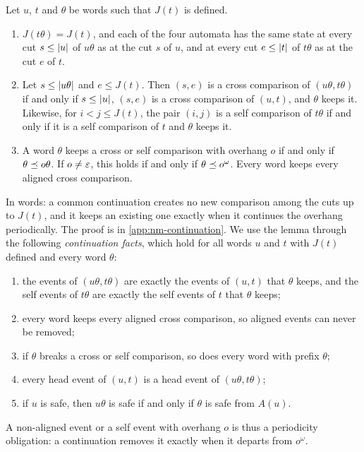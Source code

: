 \begin{lemma}\label{lem:nm-continuation}
Let $u$, $t$ and $\theta$ be words such that $J(t)$ is defined.
\begin{enumerate}[label=(\alph*)]
\item $J(t\theta)=J(t)$, and each of the four automata has the same state at
every cut $s\le\lvert u\rvert$ of $u\theta$ as at the cut $s$ of $u$, and at every cut
$e\le\lvert t\rvert$ of $t\theta$ as at the cut $e$ of $t$.
\item Let $s\le\lvert u\theta\rvert$ and $e\le J(t)$. Then $(s,e)$ is a cross
comparison of $(u\theta,t\theta)$ if and only if $s\le\lvert u\rvert$, $(s,e)$ is a
cross comparison of $(u,t)$, and $\theta$ keeps it. Likewise, for
$i<j\le J(t)$, the pair $(i,j)$ is a self comparison of $t\theta$ if and only
if it is a self comparison of $t$ and $\theta$ keeps it.
\item A word $\theta$ keeps a cross or self comparison with overhang $o$ if and
only if $\theta\preceq o\theta$. If $o\ne\varepsilon$, this holds if and only if
$\theta\preceq o^\omega$. Every word keeps every aligned cross comparison.
\end{enumerate}
\end{lemma}

In words: a common continuation creates no new comparison among the cuts up to
$J(t)$, and it keeps an existing one exactly when it continues the overhang
periodically. The proof is in \cref{app:nm-continuation}. We use the lemma
through the following \emph{continuation facts}, which hold for all words $u$
and $t$ with $J(t)$ defined and every word $\theta$:
\begin{enumerate}[label=(K\arabic*)]
\item the events of $(u\theta,t\theta)$ are exactly the events of $(u,t)$ that
$\theta$ keeps, and the self events of $t\theta$ are exactly the self events of
$t$ that $\theta$ keeps;
\item every word keeps every aligned cross comparison, so aligned events can
never be removed;
\item if $\theta$ breaks a cross or self comparison, so does every word with
prefix $\theta$;
\item every head event of $(u,t)$ is a head event of $(u\theta,t\theta)$;
\item if $u$ is safe, then $u\theta$ is safe if and only if $\theta$ is safe
from $A(u)$.
\end{enumerate}
A non-aligned event or a self event with overhang $o$ is thus a periodicity
obligation: a continuation removes it exactly when it departs from $o^\omega$.


